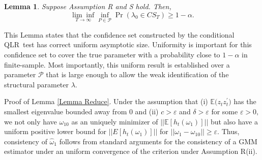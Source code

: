 \documentclass[11pt]{article}
\newtheorem{lemma}{Lemma}[section]
\begin{document}
\begin{lemma}
\label{Lemma CS}Suppose Assumption R and S hold. Then, 
\begin{equation*}
\underset{T\rightarrow \infty }{\lim \inf }\underset{P\in \mathcal{P}}{\inf }%
\Pr \left( \lambda _{0}\in CS_{T}\right) \geq 1-\alpha .
\end{equation*}
\end{lemma}

This Lemma states that the confidence set constructed by the conditional
QLR\ test has correct uniform asymptotic size. Uniformity is important for
this confidence set to cover the true parameter with a probability close to $%
1-\alpha $ in finite-sample. Most importantly, this uniform result is
established over a parameter $\mathcal{P}$ that is large enough to allow the
weak identification of the structural parameter $\lambda .$

\bigskip 

\bigskip 

\noindent Proof of Lemma \ref{Lemma Reduce}. Under the assumption that (i) $%
\mathbb{E(}z_{t}z_{t}^{\prime })$ has the smallest eigenvalue bounded away
from 0 and (ii) $c>\varepsilon $ and $\delta >\varepsilon $ for some $%
\varepsilon >0,$ we not only have $\omega _{10}$ as an uniquely minimizer of 
$||\mathbb{E}[h_{t}(\omega _{1})]||$ but also have a uniform positive lower
bound for $||E[h_{t}(\omega _{1})]||$ for $||\omega _{1}-\omega _{10}||\geq
\varepsilon .$ Thus, consistency of $\widehat{\omega }_{1}$ follows from
standard arguments for the consistency of a GMM estimator under an uniform
convergence of the criterion under Assumption R(ii). 
\end{document}
